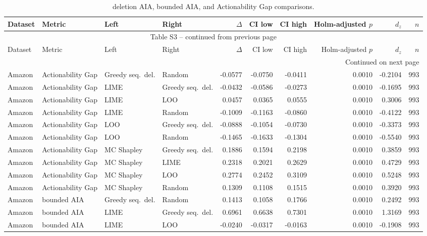 \begin{longtable}{@{}p{}p{}p{}p{}rrrrrr@{}}
\caption{deletion AIA, bounded AIA, and Actionability Gap comparisons.}\label{tab:S3}\\
\toprule
Dataset & Metric & Left & Right & $\Delta$ & CI low & CI high & Holm-adjusted $p$ & $d_z$ & $n$ \\
\midrule
\endfirsthead
\multicolumn{10}{c}{Table S3 -- continued from previous page}\\
\toprule
Dataset & Metric & Left & Right & $\Delta$ & CI low & CI high & Holm-adjusted $p$ & $d_z$ & $n$ \\
\midrule
\endhead
\midrule
\multicolumn{10}{r}{Continued on next page}\\
\endfoot
\bottomrule
\endlastfoot
Amazon & Actionability Gap & Greedy seq.\ del. & Random & -0.0577 & -0.0750 & -0.0411 & 0.0010 & -0.2104 & 993 \\
Amazon & Actionability Gap & LIME & Greedy seq.\ del. & -0.0432 & -0.0586 & -0.0273 & 0.0010 & -0.1695 & 993 \\
Amazon & Actionability Gap & LIME & LOO & 0.0457 & 0.0365 & 0.0555 & 0.0010 & 0.3006 & 993 \\
Amazon & Actionability Gap & LIME & Random & -0.1009 & -0.1163 & -0.0860 & 0.0010 & -0.4122 & 993 \\
Amazon & Actionability Gap & LOO & Greedy seq.\ del. & -0.0888 & -0.1054 & -0.0730 & 0.0010 & -0.3373 & 993 \\
Amazon & Actionability Gap & LOO & Random & -0.1465 & -0.1633 & -0.1304 & 0.0010 & -0.5540 & 993 \\
Amazon & Actionability Gap & MC Shapley & Greedy seq.\ del. & 0.1886 & 0.1594 & 0.2198 & 0.0010 & 0.3859 & 993 \\
Amazon & Actionability Gap & MC Shapley & LIME & 0.2318 & 0.2021 & 0.2629 & 0.0010 & 0.4729 & 993 \\
Amazon & Actionability Gap & MC Shapley & LOO & 0.2774 & 0.2452 & 0.3109 & 0.0010 & 0.5248 & 993 \\
Amazon & Actionability Gap & MC Shapley & Random & 0.1309 & 0.1108 & 0.1515 & 0.0010 & 0.3920 & 993 \\
Amazon & bounded AIA & Greedy seq.\ del. & Random & 0.1413 & 0.1058 & 0.1766 & 0.0010 & 0.2492 & 993 \\
Amazon & bounded AIA & LIME & Greedy seq.\ del. & 0.6961 & 0.6638 & 0.7301 & 0.0010 & 1.3169 & 993 \\
Amazon & bounded AIA & LIME & LOO & -0.0240 & -0.0317 & -0.0163 & 0.0010 & -0.1908 & 993 \\

\end{longtable}
